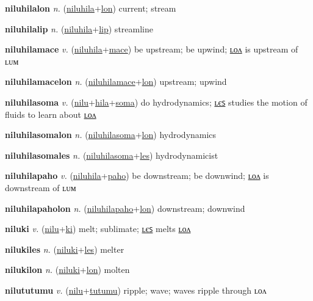 \textbf{\hypertarget{niluhilalon}{niluhilalon}} \textit{n.} (\hyperlink{niluhila}{niluhila}+\allowbreak \hyperlink{lon}{lon})
current; stream

\textbf{\hypertarget{niluhilalip}{niluhilalip}} \textit{n.} (\hyperlink{niluhila}{niluhila}+\allowbreak \hyperlink{lip}{lip})
streamline

\textbf{\hypertarget{niluhilamace}{niluhilamace}} \textit{v.} (\hyperlink{niluhila}{niluhila}+\allowbreak \hyperlink{mace}{mace})
be upstream; be upwind; \hyperlink{niluhilamacelon}{ʟᴏᴧ} is upstream of ʟᴜᴍ

\textbf{\hypertarget{niluhilamacelon}{niluhilamacelon}} \textit{n.} (\hyperlink{niluhilamace}{niluhilamace}+\allowbreak \hyperlink{lon}{lon})
upstream; upwind

\textbf{\hypertarget{niluhilasoma}{niluhilasoma}} \textit{v.} (\hyperlink{nilu}{nilu}+\allowbreak \hyperlink{hila}{hila}+\allowbreak \hyperlink{soma}{soma})
do hydrodynamics; \hyperlink{niluhilasomales}{ʟєꜱ} studies the motion of fluids to learn about \hyperlink{niluhilasomalon}{ʟᴏᴧ}

\textbf{\hypertarget{niluhilasomalon}{niluhilasomalon}} \textit{n.} (\hyperlink{niluhilasoma}{niluhilasoma}+\allowbreak \hyperlink{lon}{lon})
hydrodynamics

\textbf{\hypertarget{niluhilasomales}{niluhilasomales}} \textit{n.} (\hyperlink{niluhilasoma}{niluhilasoma}+\allowbreak \hyperlink{les}{les})
hydrodynamicist

\textbf{\hypertarget{niluhilapaho}{niluhilapaho}} \textit{v.} (\hyperlink{niluhila}{niluhila}+\allowbreak \hyperlink{paho}{paho})
be downstream; be downwind; \hyperlink{niluhilapaholon}{ʟᴏᴧ} is downstream of ʟᴜᴍ

\textbf{\hypertarget{niluhilapaholon}{niluhilapaholon}} \textit{n.} (\hyperlink{niluhilapaho}{niluhilapaho}+\allowbreak \hyperlink{lon}{lon})
downstream; downwind

\textbf{\hypertarget{niluki}{niluki}} \textit{v.} (\hyperlink{nilu}{nilu}+\allowbreak \hyperlink{ki}{ki})
melt; sublimate; \hyperlink{nilukiles}{ʟєꜱ} melts \hyperlink{nilukilon}{ʟᴏᴧ}

\textbf{\hypertarget{nilukiles}{nilukiles}} \textit{n.} (\hyperlink{niluki}{niluki}+\allowbreak \hyperlink{les}{les})
melter

\textbf{\hypertarget{nilukilon}{nilukilon}} \textit{n.} (\hyperlink{niluki}{niluki}+\allowbreak \hyperlink{lon}{lon})
molten

\textbf{\hypertarget{nilututumu}{nilututumu}} \textit{v.} (\hyperlink{nilu}{nilu}+\allowbreak \hyperlink{tutumu}{tutumu})
ripple; wave; waves ripple through ʟᴏᴧ

